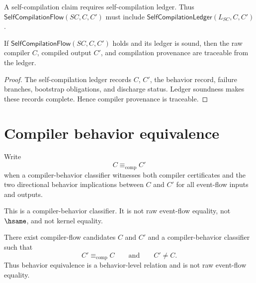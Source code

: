 \begin{principle}
\label{prin:self-hosting-no-self-compilation-without-ledger}
A self-compilation claim requires self-compilation ledger. Thus $\mathsf{SelfCompilationFlow}(SC,C,C')$ must include $\mathsf{SelfCompilationLedger}(L_{SC},C,C')$.
\end{principle}

\begin{theorem}
\label{thm:self-hosting-self-compilation-provenance}
If $\mathsf{SelfCompilationFlow}(SC,C,C')$ holds and its ledger is sound, then the raw compiler $C$, compiled output $C'$, and compilation provenance are traceable from the ledger.
\end{theorem}

\begin{proof}
The self-compilation ledger records $C$, $C'$, the behavior record, failure branches, bootstrap obligations, and discharge status. Ledger soundness makes these records complete. Hence compiler provenance is traceable.
\end{proof}

\section{Compiler behavior equivalence}
\label{sec:self-hosting-behavior-equivalence}

\begin{definition}
\label{def:self-hosting-behavior-equivalence}
Write
$$
  C\equiv_{\mathrm{comp}}C'
$$
when a compiler-behavior classifier witnesses both compiler certificates and the two directional behavior implications between $C$ and $C'$ for all event-flow inputs and outputs.

This is a compiler-behavior classifier. It is not raw event-flow equality, not $\hsame$, and not kernel equality.
\end{definition}

\begin{proposition}
\label{prop:self-hosting-behavior-equivalence-weaker}
There exist compiler-flow candidates $C$ and $C'$ and a compiler-behavior classifier such that
$$
  C'\equiv_{\mathrm{comp}}C
  \qquad\text{and}\qquad
  C'\neq C.
$$
Thus behavior equivalence is a behavior-level relation and is not raw event-flow equality.
\end{proposition}

